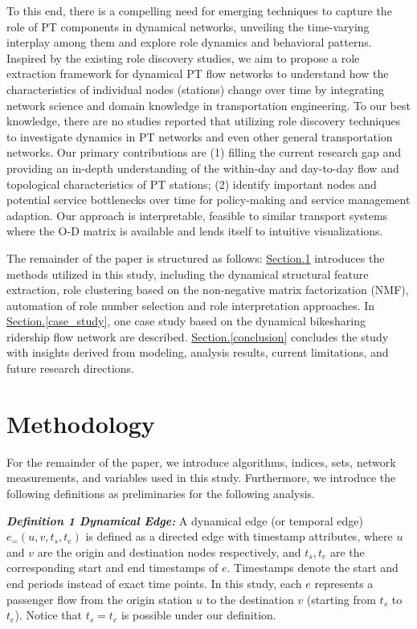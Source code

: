 \documentclass[a4paper,fleqn]{cas-sc}
\begin{document}
To this end, there is a compelling need for emerging techniques to capture the role of PT components in dynamical networks, unveiling the time-varying interplay among them and explore role dynamics and behavioral patterns.
Inspired by the existing role discovery studies, we aim to propose a role extraction framework for dynamical PT flow networks to understand how the characteristics of individual nodes (stations) change over time by integrating network science and domain knowledge in transportation engineering. To our best knowledge, there are no studies reported that utilizing role discovery techniques to investigate dynamics in PT networks and even other general transportation networks. Our primary contributions are (1) filling the current research gap and providing an in-depth understanding of the within-day and day-to-day flow and topological characteristics of PT stations; (2) identify important nodes and potential service bottlenecks over time for policy-making and service management adaption. Our approach is interpretable, feasible to similar transport systems where the O-D matrix is available and lends itself to intuitive visualizations.

The remainder of the paper is structured as follows: \hyperref[Methodology]{Section.\ref{Methodology}} introduces the methods utilized in this study, including the dynamical structural feature extraction, role clustering based on the non-negative matrix factorization (NMF), automation of role number selection and role interpretation approaches. In \hyperref[case_study]{Section.\ref{case_study}}, one case study based on the dynamical bikesharing ridership flow network are described. \hyperref[conclusion]{Section.\ref{conclusion}} concludes the study with insights derived from modeling, analysis results, current limitations, and future research directions.

\section{Methodology}\label{Methodology}
For the remainder of the paper, we introduce algorithms, indices, sets, network measurements, and variables used in this study. Furthermore, we introduce the following definitions as preliminaries for the following analysis.

\textit{\textbf{Definition 1 Dynamical Edge:}} A dynamical edge (or temporal edge) $e_=\left(u, v, t_{s},t_{e}\right)$ is defined as a directed edge with timestamp attributes, where $u$ and $v$ are the origin and destination nodes respectively, and $t_{s},t_{e}$ are the corresponding start and end timestamps of $e$. Timestamps denote the start and end periods instead of exact time points. In this study, each $e$ represents a passenger flow from the origin station $u$ to the destination $v$ (starting from $t_{s}$ to $t_{e}$). Notice that $t_{s}=t_{e}$ is possible under our definition.
\end{document}
